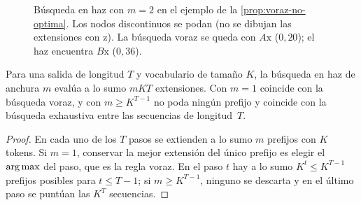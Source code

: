 \begin{figure}[h]
\centering
{}
\caption{Búsqueda en haz con $m=2$ en el ejemplo de la \cref{prop:voraz-no-optima}. Los nodos discontinuos se podan (no se dibujan las extensiones con $\mathrm{z}$). La búsqueda voraz se queda con $A\mathrm{x}$ ($0{,}20$); el haz encuentra $B\mathrm{x}$ ($0{,}36$).}
\label{fig:haz}
\end{figure}

\begin{proposicion}\label{prop:coste-haz}
Para una salida de longitud $T$ y vocabulario de tamaño $K$, la búsqueda en haz de anchura $m$ evalúa a lo sumo $mKT$ extensiones. Con $m=1$ coincide con la búsqueda voraz, y con $m\ge K^{T-1}$ no poda ningún prefijo y coincide con la búsqueda exhaustiva entre las secuencias de longitud~$T$.
\end{proposicion}

\begin{proof}
En cada uno de los $T$ pasos se extienden a lo sumo $m$ prefijos con $K$ tokens. Si $m=1$, conservar la mejor extensión del único prefijo es elegir el $\operatorname*{arg\,max}$ del paso, que es la regla voraz. En el paso $t$ hay a lo sumo $K^{t}\le K^{T-1}$ prefijos posibles para $t\le T-1$; si $m\ge K^{T-1}$, ninguno se descarta y en el último paso se puntúan las $K^{T}$ secuencias.
\end{proof}

